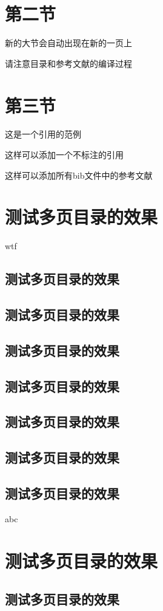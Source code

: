 \documentclass[a4paper,cs4size,UTF8,winfonts,boldfont,slantfont]{ctexart}
\begin{document}
	\section{第二节}
		新的大节会自动出现在新的一页上
		
		请注意目录和参考文献的编译过程
	\section{第三节}
	这是一个引用的范例\cite{Stone_1998}
	
	这样可以添加一个不标注的引用\nocite{9787508342894}
	
	这样可以添加所有bib文件中的参考文献\nocite{*}
	
	\section{测试多页目录的效果}
	wtf
	\subsection{测试多页目录的效果}
	\subsection{测试多页目录的效果}
	\subsection{测试多页目录的效果}
	\subsection{测试多页目录的效果}
	\subsection{测试多页目录的效果}
	\subsection{测试多页目录的效果}
	\subsection{测试多页目录的效果}
	abc
	\section{测试多页目录的效果}
	\subsection{测试多页目录的效果}
\end{document}
